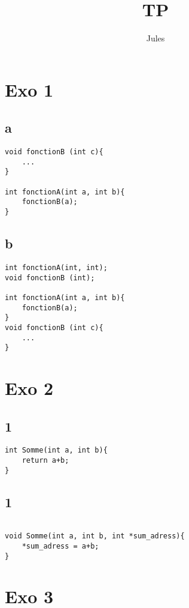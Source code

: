 \documentclass{article}
\title{TP}
\author{Jules}
\begin{document}
\maketitle


\section*{Exo 1}
\subsection*{a}
\begin{lstlisting}
void fonctionB (int c){
    ...
}

int fonctionA(int a, int b){
    fonctionB(a);
}
\end{lstlisting}

\subsection*{b}
\begin{lstlisting}
int fonctionA(int, int);
void fonctionB (int);

int fonctionA(int a, int b){
    fonctionB(a);
}
void fonctionB (int c){
    ...
}
\end{lstlisting}

\section*{Exo 2}

\subsection*{1}

\begin{lstlisting}
int Somme(int a, int b){
    return a+b;
}
\end{lstlisting}

\subsection*{1}

\begin{lstlisting}

void Somme(int a, int b, int *sum_adress){
    *sum_adress = a+b;
}
\end{lstlisting}

\section*{Exo 3}
\end{document}
